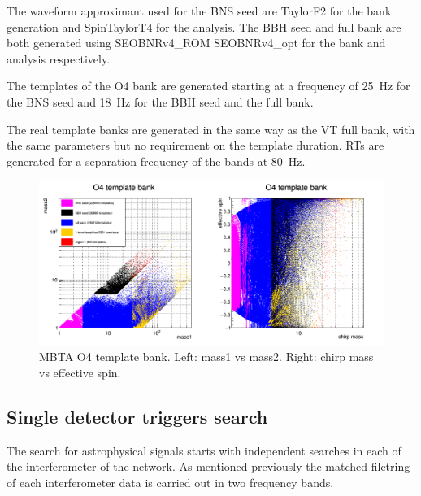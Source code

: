 The waveform approximant used for the BNS seed are TaylorF2 \cite{taylorf2}  for the bank generation and SpinTaylorT4 \cite{spintaylort4}  for the analysis.
The BBH seed and full bank are both generated using SEOBNRv4\_ROM SEOBNRv4\_opt \cite{seobnrv4_rom} for the bank and analysis respectively.

The templates of the O4 bank are generated starting at a frequency of \SI{25}{Hz} for the BNS seed and \SI{18}{Hz} for the BBH seed and the full bank.

The real template banks are generated in the same way as the VT full bank, with the same parameters but no requirement on the template duration.
RTs are generated for a separation frequency of the bands at \SI{80}{\hertz}.




\begin{figure}[ht]
  \centering
  \includegraphics[width=\textwidth]{cBankO4.png}
  \caption{MBTA O4 template bank. Left: mass1 vs mass2. Right: chirp mass vs effective spin.}
  \label{fig:bankO4}
\end{figure}




\subsection{Single detector triggers search}
\label{sec:single_search}
The search for astrophysical signals starts with independent searches in each of the interferometer of the network.
As mentioned previously the matched-filetring of each interferometer data is carried out in two frequency bands.

